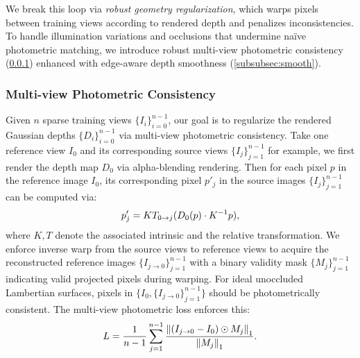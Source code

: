 We break this loop via \emph{robust geometry regularization}, which warps pixels between training views according to rendered depth and penalizes inconsistencies. 
To handle illumination variations and occlusions that undermine naïve photometric matching, we introduce robust multi-view photometric consistency (\cref{subsubsec:mpc}) enhanced with edge-aware depth smoothness (\cref{subsubsec:smooth}).






\subsubsection{Multi-view Photometric Consistency}
\label{subsubsec:mpc}

Given $n$ sparse training views $\{I_i\}_{i=0}^{n-1}$, our goal is to regularize the rendered Gaussian depths $\{D_i\}_{i=0}^{n-1}$ via multi-view photometric consistency.
Take one reference view $I_{\text{0}}$ and its corresponding source views $\{I_j\}_{j=1}^{n-1}$ for example, we first render the depth map $D_{\text{0}}$ via alpha-blending rendering. 
Then for each pixel $p$ in the reference image $I_{\text{0}}$, its corresponding pixel $p'_{j}$ in the source images $\{I_j\}_{j=1}^{n-1}$ can be computed via:
\begin{equation}
  \vspace{-0.2cm}
  \label{eq:inverse_warp} 
    p'_{j} = KT_{0 \rightarrow j}(D_{0}(p) \cdot K^{-1} p),    
\end{equation}
where $K, T$ denote the associated intrinsic and the relative transformation.
We enforce inverse warp from the source views to reference views to acquire the reconstructed reference images
$\{I_{j \rightarrow 0} \}_{j=1}^{n-1}$ with a binary validity mask $\{M_j\}_{j=1}^{n-1}$ indicating valid  projected pixels during warping. 
For ideal unoccluded Lambertian surfaces, pixels  in $\{ I_0, \{I_{j \rightarrow 0} \}_{j=1}^{n-1}  \}$ should be photometrically consistent. 
The multi-view photometric loss enforces this:
\begin{equation}
  \vspace{-0.2cm}
\label{eq:mpc_rgb}
L = \frac{1}{n-1} \sum_{j=1}^{n-1}  \frac  {\left\| (I_{j \rightarrow 0} - I_{\text{0}}) \odot M_j  \right\|_1} {\left\|  M_j \right\|_1}.
\end{equation}




